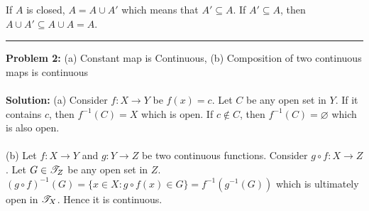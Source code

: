 \documentclass[main.tex]{subfiles}
\begin{document}
If $A$ is closed, $A=A \cup A'$ which means that $A' \subseteq A$.
If $A' \subseteq A$, then $A\cup A' \subseteq A \cup A= A$. 

\par\noindent\rule{\textwidth}{0.4pt}
\textbf{Problem 2:} (a) Constant map is Continuous, (b) Composition of two continuous maps is continuous
\\\\ \textbf{Solution:} (a) Consider $f:X \to Y$ be $f(x)=c$. Let $C$ be any open set in $Y$. If it contains $c$, then $f^{-1}(C)=X$ which is open. If $c \not \in C$, then $f^{-1}(C)=\varnothing$ which is also open.
\\\\ (b) Let $f:X \to Y$ and $g:Y \to Z$ be two continuous functions. Consider $g \circ f: X \to Z$. Let $G \in \mathscr T_Z$ be any open set in $Z$. $(g \circ f)^{-1}(G)=\{x \in X: g \circ f(x) \in G\}=f^{-1}(g^{-1}(G))$ which is ultimately open in $\mathscr T_X$. Hence it is continuous.
\end{document}
